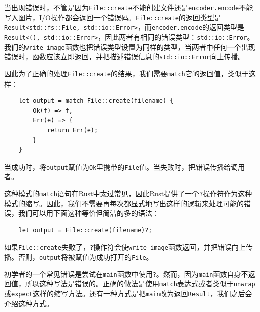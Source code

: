 当出现错误时，不管是因为\texttt{File::create}不能创建文件还是\texttt{encoder.encode}不能写入图片，I/O操作都会返回一个错误码。\texttt{File::create}的返回类型是\texttt{Result<std::fs::File, std::io::Error>}，而\texttt{encoder.encode}的返回类型是\texttt{Result<(), std::io::Error>}，因此两者有相同的错误类型：\texttt{std::io::Error}。我们的\texttt{write\_image}函数也把错误类型设置为同样的类型，当两者中任何一个出现错误时，函数应该立即返回，并把描述错误信息的\texttt{std::io::Error}向上传播。

因此为了正确的处理\texttt{File::create}的结果，我们需要\texttt{match}它的返回值，类似于这样：
\begin{verbatim}
    let output = match File::create(filename) {
        Ok(f) => f,
        Err(e) => {
            return Err(e);
        }
    }
\end{verbatim}

当成功时，将\texttt{output}赋值为\texttt{Ok}里携带的\texttt{File}值。当失败时，把错误传播给调用者。

这种模式的\texttt{match}语句在Rust中太过常见，因此Rust提供了一个\texttt{?}操作符作为这种模式的缩写。因此，我们不需要再每次都显式地写出这样的逻辑来处理可能的错误，我们可以用下面这种等价但简洁的多的语法：
\begin{verbatim}
    let output = File::create(filename)?;
\end{verbatim}

如果\texttt{File::create}失败了，\texttt{?}操作符会使\texttt{write\_image}函数返回，并把错误向上传播。否则，\texttt{output}将被赋值为成功打开的\texttt{File}。

\begin{note}
    初学者的一个常见错误是尝试在\texttt{main}函数中使用\texttt{?}。然而，因为\texttt{main}函数自身不返回值，所以这种写法是错误的。正确的做法是使用\texttt{match}表达式或者类似于\texttt{unwrap}或\texttt{expect}这样的缩写方法。还有一种方式是把\texttt{main}改为返回\texttt{Result}，我们之后会介绍这种方式。
\end{note}

